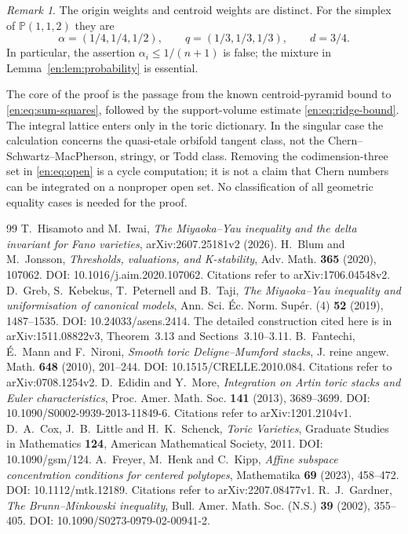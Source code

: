 \documentclass[12pt]{amsart}
\theoremstyle{definition}
\theoremstyle{remark}
\newtheorem{rem}[thm]{Remark}
\numberwithin{equation}{section}
\theoremstyle{plain}
\theoremstyle{definition}
\theoremstyle{remark}
\begin{document}
\begin{rem}\label{en:rem:scope}
The origin weights and centroid weights are distinct. For the simplex of
$\mathbb P(1,1,2)$ they are \[\alpha=(1/4,1/4,1/2),\qquad q=(1/3,1/3,1/3),\qquad d=3/4.\] In particular, the assertion
$\alpha_i\le1/(n+1)$ is false; the mixture in Lemma~\ref{en:lem:probability}
is essential.

The core of the proof is the passage from the known centroid-pyramid bound to
\eqref{en:eq:sum-squares}, followed by the support-volume estimate
\eqref{en:eq:ridge-bound}. The integral lattice enters only in the toric dictionary. In the singular case the calculation concerns the quasi-etale orbifold tangent class, not the Chern--Schwartz--MacPherson, stringy, or Todd class. Removing the codimension-three set in \eqref{en:eq:open} is a cycle computation; it is not a claim that Chern numbers can be integrated on a nonproper open set. No classification of all geometric equality cases is needed for the proof.
\end{rem}
\begin{thebibliography}{99}
T.~Hisamoto and M.~Iwai,
\emph{The Miyaoka--Yau inequality and the delta invariant for Fano varieties},
arXiv:2607.25181v2 (2026).
H.~Blum and M.~Jonsson,
\emph{Thresholds, valuations, and K-stability},
Adv. Math. \textbf{365} (2020), 107062.
DOI: 10.1016/j.aim.2020.107062.
Citations refer to arXiv:1706.04548v2.
D.~Greb, S.~Kebekus, T.~Peternell and B.~Taji,
\emph{The Miyaoka--Yau inequality and uniformisation of canonical models},
Ann. Sci. \'Ec. Norm. Sup\'er. (4) \textbf{52} (2019), 1487--1535.
DOI: 10.24033/asens.2414.
The detailed construction cited here is in arXiv:1511.08822v3,
Theorem~3.13 and Sections~3.10--3.11.
B.~Fantechi, \'E.~Mann and F.~Nironi,
\emph{Smooth toric Deligne--Mumford stacks},
J. reine angew. Math. \textbf{648} (2010), 201--244.
DOI: 10.1515/CRELLE.2010.084.
Citations refer to arXiv:0708.1254v2.
D.~Edidin and Y.~More,
\emph{Integration on Artin toric stacks and Euler characteristics},
Proc. Amer. Math. Soc. \textbf{141} (2013), 3689--3699.
DOI: 10.1090/S0002-9939-2013-11849-6.
Citations refer to arXiv:1201.2104v1.
D.~A.~Cox, J.~B.~Little and H.~K.~Schenck,
\emph{Toric Varieties},
Graduate Studies in Mathematics \textbf{124},
American Mathematical Society, 2011.
DOI: 10.1090/gsm/124.
A.~Freyer, M.~Henk and C.~Kipp,
\emph{Affine subspace concentration conditions for centered polytopes},
Mathematika \textbf{69} (2023), 458--472.
DOI: 10.1112/mtk.12189.
Citations refer to arXiv:2207.08477v1.
R.~J.~Gardner,
\emph{The Brunn--Minkowski inequality},
Bull. Amer. Math. Soc. (N.S.) \textbf{39} (2002), 355--405.
DOI: 10.1090/S0273-0979-02-00941-2.
\end{thebibliography}
\end{document}
